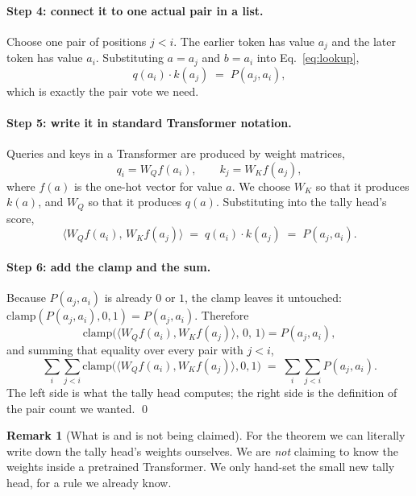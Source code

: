 \documentclass[10pt]{article}
\theoremstyle{definition}
\newtheorem{remark}{Remark}
\newcommand{\clampf}{\mathrm{clamp}}
\begin{document}
\begin{appendices}
\paragraph{Step 4: connect it to one actual pair in a list.}
Choose one pair of positions $j < i$. The earlier token has value $a_j$
and the later token has value $a_i$. Substituting $a = a_j$ and $b = a_i$
into Eq.~\eqref{eq:lookup},
\[
q(a_i) \cdot k(a_j) \;=\; P(a_j, a_i),
\]
which is exactly the pair vote we need.

\paragraph{Step 5: write it in standard Transformer notation.}
Queries and keys in a Transformer are produced by weight matrices,
\[
q_i = W_Q f(a_i), \qquad k_j = W_K f(a_j),
\]
where $f(a)$ is the one-hot vector for value $a$. We choose $W_K$ so that
it produces $k(a)$, and $W_Q$ so that it produces $q(a)$. Substituting
into the tally head's score,
\begin{equation}
\big\langle W_Q f(a_i),\, W_K f(a_j) \big\rangle
\;=\; q(a_i) \cdot k(a_j)
\;=\; P(a_j, a_i).
\label{eq:bridge}
\end{equation}

\paragraph{Step 6: add the clamp and the sum.}
Because $P(a_j, a_i)$ is already $0$ or $1$, the clamp leaves it
untouched: $\clampf(P(a_j,a_i), 0, 1) = P(a_j, a_i)$. Therefore
\[
\clampf\big(\langle W_Q f(a_i), W_K f(a_j)\rangle,\, 0,\, 1\big) = P(a_j, a_i),
\]
and summing that equality over every pair with $j < i$,
\begin{equation}
\sum_i \sum_{j<i} \clampf\big(\langle W_Q f(a_i), W_K f(a_j)\rangle, 0, 1\big)
\;=\; \sum_i \sum_{j<i} P(a_j, a_i).
\label{eq:pairhalf}
\end{equation}
The left side is what the tally head computes; the right side is the
definition of the pair count we wanted. \qed

\begin{remark}[What is and is not being claimed]
\label{rem:not-claiming}
For the theorem we can literally write down the tally head's weights
ourselves. We are \emph{not} claiming to know the weights inside a
pretrained Transformer. We only hand-set the small new tally head, for a
rule we already know.
\end{remark}


\end{appendices}
\end{document}
